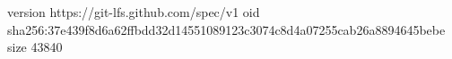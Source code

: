 version https://git-lfs.github.com/spec/v1
oid sha256:37e439f8d6a62ffbdd32d14551089123c3074c8d4a07255cab26a8894645bebe
size 43840

